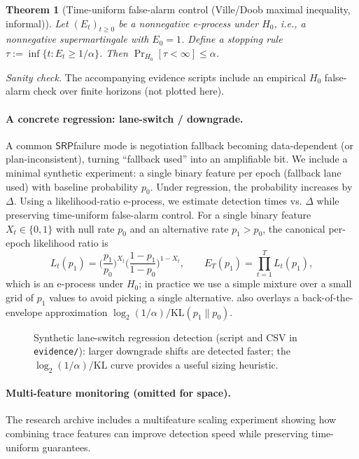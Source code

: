 \documentclass[11pt]{article}
\newtheorem{theorem}{Theorem}
\newcommand{\SRP}{\ensuremath{\mathsf{SRP}}}
\begin{document}
\begin{theorem}[Time-uniform false-alarm control (Ville/Doob maximal inequality, informal)]
Let $(E_t)_{t\ge 0}$ be a nonnegative \emph{e-process} under $H_0$, i.e., a nonnegative supermartingale with $E_0=1$.
Define a stopping rule $\tau := \inf\{t : E_t \ge 1/\alpha\}$.
Then $\Pr_{H_0}[\tau < \infty] \le \alpha$.\cite{villeCollectif1939,ramdasEvaluesEbook2025,howardConfidenceSequencesAOS2021,rufCompositeVille2023,koolenVille2026}
\end{theorem}
\noindent\emph{Sanity check.} The accompanying evidence scripts include an empirical $H_0$ false-alarm check over finite horizons (not plotted here).


\paragraph{A concrete regression: lane-switch / downgrade.}
A common \SRP failure mode is negotiation fallback becoming data-dependent (or plan-inconsistent),
turning ``fallback used'' into an amplifiable bit.
We include a minimal synthetic experiment: a single binary feature per epoch (fallback lane used) with baseline probability $p_0$.
Under regression, the probability increases by $\Delta$.
Using a likelihood-ratio e-process, we estimate detection times vs. $\Delta$ while preserving time-uniform false-alarm control.
For a single binary feature $X_t\in\{0,1\}$ with null rate $p_0$ and an alternative rate $p_1>p_0$, the canonical per-epoch likelihood ratio is
\[L_t(p_1)=\Big(\frac{p_1}{p_0}\Big)^{X_t}\Big(\frac{1-p_1}{1-p_0}\Big)^{1-X_t},\qquad E_T(p_1)=\prod_{t=1}^{T} L_t(p_1),\]
which is an e-process under $H_0$; in practice we use a simple mixture over a small grid of $p_1$ values to avoid picking a single alternative.
 also overlays a back-of-the-envelope approximation
$\log_2(1/\alpha)/\mathrm{KL}(p_1\|p_0)$.

\begin{figure}[t]
  \centering
  \caption{Synthetic lane-switch regression detection (script and CSV in \texttt{evidence/}): larger downgrade shifts are detected faster; the $\log_2(1/\alpha)/\mathrm{KL}$ curve provides a useful sizing heuristic.}
  \label{fig:laneswitch}
\end{figure}

\paragraph{Multi-feature monitoring (omitted for space).}
The research archive includes a multifeature scaling experiment showing how combining trace features can improve detection speed while preserving time-uniform guarantees.
\end{document}
